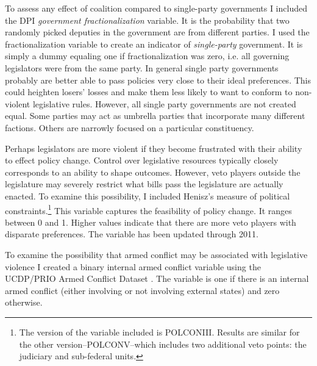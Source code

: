 \documentclass[a4paper]{article}\usepackage[]{graphicx}\usepackage[]{color}
\begin{document}
To assess any effect of coalition compared to single-party governments I included the DPI {\emph{government fractionalization}} variable. It is the probability that two randomly picked deputies in the government are from different parties. I used the fractionalization variable to create an indicator of {\emph{single-party}} government. It is simply a dummy equaling one if fractionalization was zero, i.e. all governing legislators were from the same party. In general single party governments probably are better able to pass policies very close to their ideal preferences. This could heighten losers' losses and make them less likely to want to conform to non-violent legislative rules. However, all single party governments are not created equal. Some parties may act as umbrella parties that incorporate many different factions. Others are narrowly focused on a particular constituency.

Perhaps legislators are more violent if they become frustrated with their ability to effect policy change. Control over legislative resources typically closely corresponds to an ability to shape outcomes. However, veto players outside the legislature may severely restrict what bills pass the legislature are actually enacted. To examine this possibility, I included Henisz's \citeyearpar{Henisz2004} measure of political constraints.\footnote{The version of the variable included is POLCONIII. Results are similar for the other version--POLCONV--which includes two additional veto points: the judiciary and sub-federal units.} This variable captures the feasibility of policy change. It ranges between 0 and 1. Higher values indicate that there are more veto players with disparate preferences. The variable has been updated through 2011.

To examine the possibility that armed conflict may be associated with legislative violence I created a binary internal armed conflict variable using the UCDP/PRIO Armed Conflict Dataset \citep{Themner2014}. The variable is one if there is an internal armed conflict (either involving or not involving external states) and zero otherwise.
\end{document}
